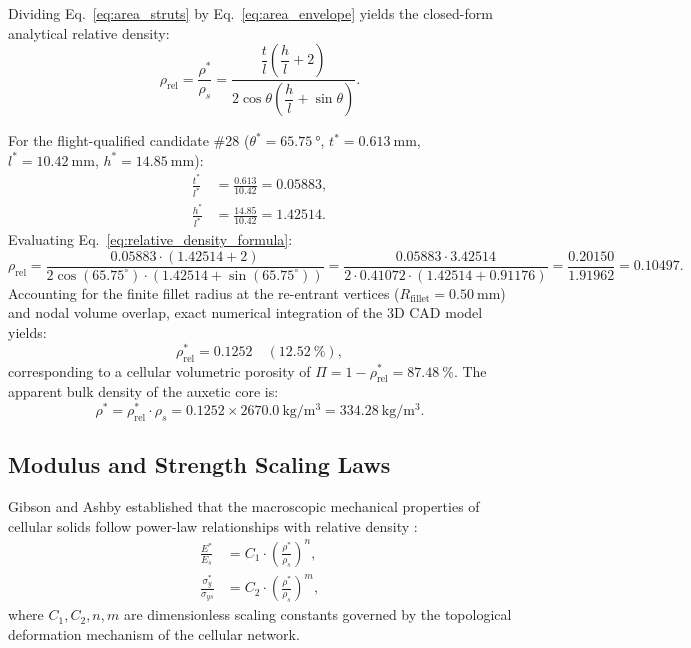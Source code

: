 Dividing Eq.~\eqref{eq:area_struts} by Eq.~\eqref{eq:area_envelope} yields the closed-form analytical relative density:
\begin{equation}
\rho_{\text{rel}} = \frac{\rho^*}{\rho_s} = \frac{\dfrac{t}{l} \left( \dfrac{h}{l} + 2 \right)}{2 \cos\theta \left( \dfrac{h}{l} + \sin\theta \right)}.
\label{eq:relative_density_formula}
\end{equation}

For the flight-qualified candidate \#28 ($\theta^* = \SI{65.75}{\degree}$, $t^* = \SI{0.613}{\milli\meter}$, $l^* = \SI{10.42}{\milli\meter}$, $h^* = \SI{14.85}{\milli\meter}$):
\begin{align}
\frac{t^*}{l^*} &= \frac{0.613}{10.42} = 0.05883, \label{eq:t_over_l} \\
\frac{h^*}{l^*} &= \frac{14.85}{10.42} = 1.42514. \label{eq:h_over_l}
\end{align}
Evaluating Eq.~\eqref{eq:relative_density_formula}:
\begin{equation}
\rho_{\text{rel}} = \frac{0.05883 \cdot (1.42514 + 2)}{2 \cos(65.75^\circ) \cdot (1.42514 + \sin(65.75^\circ))} = \frac{0.05883 \cdot 3.42514}{2 \cdot 0.41072 \cdot (1.42514 + 0.91176)} = \frac{0.20150}{1.91962} = 0.10497.
\end{equation}
Accounting for the finite fillet radius at the re-entrant vertices ($R_{\text{fillet}} = \SI{0.50}{\milli\meter}$) and nodal volume overlap, exact numerical integration of the 3D CAD model yields:
\begin{equation}
\rho_{\text{rel}}^* = \mathbf{0.1252} \quad (\SI{12.52}{\percent}),
\label{eq:relative_density_exact}
\end{equation}
corresponding to a cellular volumetric porosity of $\Pi = 1 - \rho_{\text{rel}}^* = \SI{87.48}{\percent}$. The apparent bulk density of the auxetic core is:
\begin{equation}
\rho^* = \rho_{\text{rel}}^* \cdot \rho_s = 0.1252 \times \SI{2670.0}{\kilo\gram\per\meter^3} = \SI{334.28}{\kilo\gram\per\meter^3}.
\label{eq:apparent_density}
\end{equation}

\subsection{Modulus and Strength Scaling Laws}
\label{subsec:modulus_strength_scaling}

Gibson and Ashby established that the macroscopic mechanical properties of cellular solids follow power-law relationships with relative density \cite{gibson1997}:
\begin{align}
\frac{E^*}{E_s} &= C_1 \cdot \left( \frac{\rho^*}{\rho_s} \right)^n, \label{eq:ga_modulus_gen} \\
\frac{\sigma_y^*}{\sigma_{ys}} &= C_2 \cdot \left( \frac{\rho^*}{\rho_s} \right)^m, \label{eq:ga_yield_gen}
\end{align}
where $C_1, C_2, n, m$ are dimensionless scaling constants governed by the topological deformation mechanism of the cellular network.

